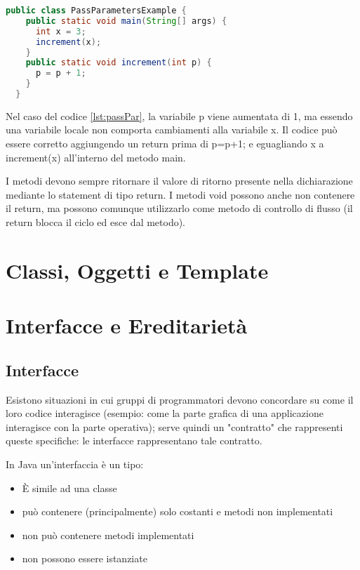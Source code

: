 \documentclass[a4paper,12pt,twoside]{book}
\begin{document}
\begin{lstlisting}[caption={Passaggio di parametri},
  label={lst:passPar},language=Java]
  public class PassParametersExample {
    public static void main(String[] args) {
      int x = 3;
      increment(x);
    }
    public static void increment(int p) {
      p = p + 1;
    }
  }
\end{lstlisting}

Nel caso del codice \ref{lst:passPar}, la variabile p viene aumentata
di 1, ma essendo una variabile locale non comporta cambiamenti alla
variabile x. Il codice può essere corretto aggiungendo un return prima
di p=p+1; e eguagliando x a increment(x) all'interno del metodo main.

I metodi devono sempre ritornare il valore di ritorno presente nella
dichiarazione mediante lo statement di tipo return. I metodi void
possono anche non contenere il return, ma possono comunque utilizzarlo
come metodo di controllo di flusso (il return blocca il ciclo ed esce
dal metodo).

\chapter{Classi, Oggetti e Template}

\chapter{Interfacce e Ereditarietà}

\section{Interfacce}
Esistono situazioni in cui gruppi di programmatori devono concordare
su come il loro codice interagisce (esempio: come la parte grafica di
una applicazione interagisce con la parte operativa); serve quindi un
"contratto" che rappresenti queste specifiche: le interfacce
rappresentano tale contratto.

In Java un'interfaccia è un tipo:
\begin{itemize}
\item È simile ad una classe
\item può contenere (principalmente) solo
  costanti e metodi non implementati
\item non può contenere metodi implementati
\item non possono essere istanziate
\end{itemize}
\end{document}
